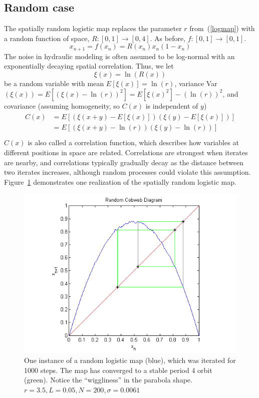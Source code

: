 \subsection{Random case}
The spatially random logistic map replaces the parameter $r$ from~(\ref{logmap}) with a random function of space, $R:[0,1]\to [0,4]$. As before,
$f:[0,1]\to [0,1]$.
\begin{equation}\label{randlogmap}
x_{n+1} = f(x_n) = R(x_n)x_n(1-x_n)
\end{equation}
The noise in hydraulic modeling is often assumed to be log-normal with an
exponentially decaying spatial correlation. Thus, we let
\begin{equation}\label{R}
\xi(x)=\ln(R(x)) 
\end{equation}
be a random variable with mean $E[\xi(x)] = \ln(r)$, variance
Var$(\xi(x))=E[(\xi(x) - \ln(r))^2]=E[\xi(x)^2]-(\ln(r))^2$, and
covariance (assuming homogeneity, so $C(x)$ is independent of $y$)
\begin{align}
\begin{split}\label{cor}
C(x) &=E[(\xi(x+y) - E[\xi(x)])(\xi(y)-E[\xi(x)])] \\
&= E[(\xi(x+y) -\ln(r))(\xi(y)-\ln(r))] \\
\end{split}
\end{align}
$C(x)$ is also called a correlation function, which
describes how variables at different positions in space are
related. Correlations are strongest when iterates are nearby, and
correlations typically gradually decay as
the distance between two iterates increases, although random processes
could violate this assumption. 
Figure~\ref{fig:rlogstable} demonstrates one realization of the
spatially random logistic map.
\begin{figure}[!h]
\caption[Random logistic map, stable orbit]{One instance of a random
  logistic map (blue), which was iterated for 1000 steps. The map has converged to a stable period 4 orbit (green). Notice the
  ``wiggliness'' in the parabola shape. $r=3.5,L=0.05,N=200,\sigma=0.0061$}\label{fig:rlogstable}
	\begin{center}
		\includegraphics[scale=0.7]{figs/rand_cobweb.png}
	\end{center}
\end{figure}
